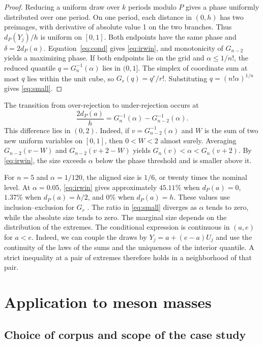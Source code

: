 \documentclass[11pt,a4paper]{article}
\begin{document}
\begin{proof}
Reducing a uniform draw over $k$ periods modulo $P$ gives a phase uniformly distributed over one period. On one period, each distance in $(0,h)$ has two preimages, with derivative of absolute value 1 on the two branches. Thus $d_P(Y_j)/h$ is uniform on $[0,1]$. Both endpoints have the same phase and $\delta=2d_P(a)$. Equation~\eqref{eq:cond} gives \eqref{eq:irwin}, and monotonicity of $G_{n-2}$ yields a maximizing phase. If both endpoints lie on the grid and $\alpha\leq1/n!$, the reduced quantile $q=G_n^{-1}(\alpha)$ lies in $(0,1]$. The simplex of coordinate sum at most $q$ lies within the unit cube, so $G_r(q)=q^r/r!$. Substituting $q=(n!\alpha)^{1/n}$ gives \eqref{eq:small}.
\end{proof}

The transition from over-rejection to under-rejection occurs at
\[
\frac{2d_P(a)}{h}=G_n^{-1}(\alpha)-G_{n-2}^{-1}(\alpha).
\]
This difference lies in $(0,2)$. Indeed, if $v=G_{n-2}^{-1}(\alpha)$ and $W$ is the sum of two new uniform variables on $[0,1]$, then $0<W<2$ almost surely. Averaging $G_{n-2}(v-W)$ and $G_{n-2}(v+2-W)$ yields $G_n(v)<\alpha<G_n(v+2)$. By \eqref{eq:irwin}, the size exceeds $\alpha$ below the phase threshold and is smaller above it.

For $n=5$ and $\alpha=1/120$, the aligned size is $1/6$, or twenty times the nominal level. At $\alpha=0.05$, \eqref{eq:irwin} gives approximately $45.11\%$ when $d_P(a)=0$, $1.37\%$ when $d_P(a)=h/2$, and $0\%$ when $d_P(a)=h$. These values use inclusion--exclusion for $G_r$ \cite{irwinhall}. The ratio in \eqref{eq:small} diverges as $\alpha$ tends to zero, while the absolute size tends to zero. The marginal size depends on the distribution of the extremes. The conditional expression is continuous in $(a,e)$ for $a<e$. Indeed, we can couple the draws by $Y_j=a+(e-a)U_j$ and use the continuity of the laws of the sums and the uniqueness of the interior quantile. A strict inequality at a pair of extremes therefore holds in a neighborhood of that pair.

\section{Application to meson masses}\label{sec:application}

\subsection{Choice of corpus and scope of the case study}
\end{document}
